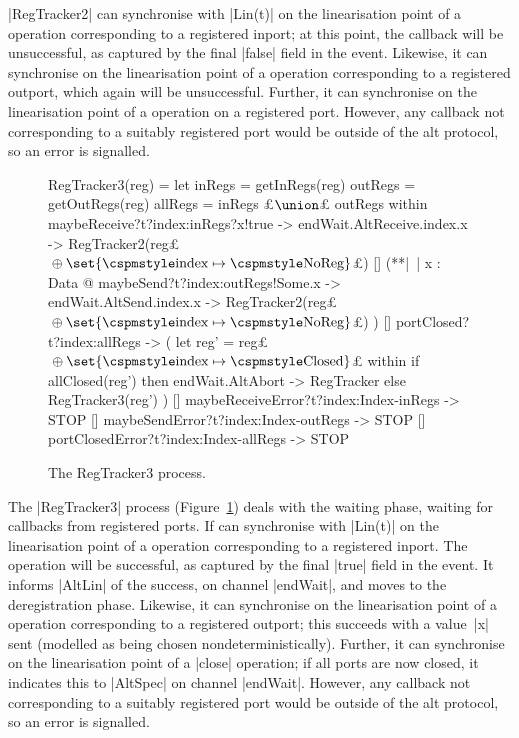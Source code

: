 |RegTracker2| can synchronise with |Lin(t)| on the linearisation point of a
 operation corresponding to a registered inport; at this
point, the callback will be unsuccessful, as captured by the final |false|
field in the event.  Likewise, it can synchronise on the linearisation point
of a  operation corresponding to a registered outport, which
again will be unsuccessful.  Further, it can synchronise on the linearisation
point of a  operation on a registered port.  However, any
callback not corresponding to a suitably registered port would be outside of
the alt protocol, so an error is signalled. 


\begin{figure}
\begin{cspm}
RegTracker3(reg) = 
  let inRegs = getInRegs(reg) 
      outRegs = getOutRegs(reg)
      allRegs = inRegs £$\union$£ outRegs within
  maybeReceive?t?index:inRegs?x!true -> 
    endWait.AltReceive.index.x -> RegTracker2(reg£%
    $\null\oplus \set{\CSPMMR{index} \mapsto \CSPMMR{NoReg}}$£)
  [] (**|~| x : Data @ maybeSend?t?index:outRegs!Some.x -> 
     endWait.AltSend.index.x -> RegTracker2(reg£%
    $\null\oplus \set{\CSPMMR{index} \mapsto \CSPMMR{NoReg}}$£) )
  [] portClosed?t?index:allRegs -> ( 
    let reg' = reg£%
      $\null\oplus \set{\CSPMMR{index} \mapsto \CSPMMR{Closed}}$£ within
    if allClosed(reg') then endWait.AltAbort -> RegTracker else RegTracker3(reg')
  )
  [] maybeReceiveError?t?index:Index-inRegs -> STOP
  [] maybeSendError?t?index:Index-outRegs -> STOP
  [] portClosedError?t?index:Index-allRegs -> STOP
\end{cspm}
\caption{The {\scalastyle RegTracker3} process.  \label{fig:RegTracker3}}
\end{figure}


The |RegTracker3| process (Figure~\ref{fig:RegTracker3}) deals with the
waiting phase, waiting for callbacks from registered ports.  If can
synchronise with |Lin(t)| on the linearisation point of a 
operation corresponding to a registered inport.  The operation will be
successful, as captured by the final |true| field in the event.  It informs
|AltLin| of the success, on channel |endWait|, and moves to the deregistration
phase.  Likewise, it can synchronise on the linearisation point of a
 operation corresponding to a registered outport; this
succeeds with a value~|x| sent (modelled as being chosen
nondeterministically).  Further, it can synchronise on the linearisation point
of a |close| operation; if all ports are now closed, it indicates this to
|AltSpec| on channel |endWait|.  However, any callback not corresponding to a
suitably registered port would be outside of the alt protocol, so an error is
signalled.

